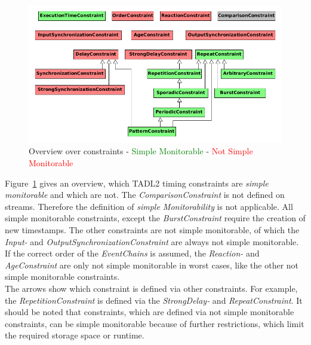 \begin{figure}
	\centering
	\includegraphics[width=\linewidth]{relationBetweenConstraint}
	\caption{Overview over constraints - \textcolor{green}{Simple Monitorable} - \textcolor{red}{Not Simple Monitorable}}
	\label{fig:relationbetweenconstraint}
\end{figure}
Figure~\ref{fig:relationbetweenconstraint} gives an overview, which TADL2 timing constraints are \textit{simple monitorable} and which are not. The \textit{ComparisonConstraint} is not defined on streams. Therefore the definition of \textit{simple Monitorability} is not applicable. All simple monitorable constraints, except the \textit{BurstConstraint} require the creation of new timestamps. The other constraints are not simple monitorable, of which the \emph{Input-} and \emph{OutputSynchronizationConstraint} are always not simple monitorable. If the correct order of the \textit{EventChains} is assumed, the \textit{Reaction-} and \textit{AgeConstraint} are only not simple monitorable in worst cases, like the other not simple monitorable constraints.\\
The arrows show which constraint is defined via other constraints. For example, the \emph{RepetitionConstraint} is defined via the \emph{StrongDelay-} and \emph{RepeatConstraint}. It should be noted that constraints, which are defined via not simple monitorable constraints, can be simple monitorable because of further restrictions, which limit the required storage space or runtime.

